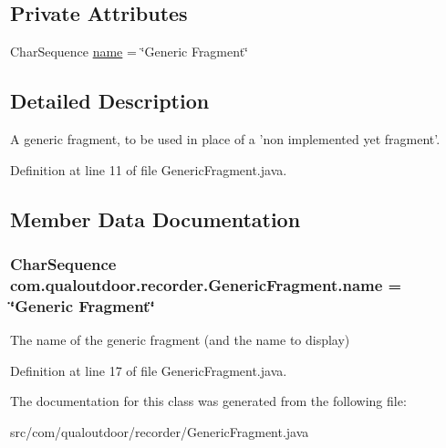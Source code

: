 \subsection*{Private Attributes}
\begin{DoxyCompactItemize}
\item 
Char\-Sequence \hyperlink{classcom_1_1qualoutdoor_1_1recorder_1_1GenericFragment_abd35750acf1a4b68e302201fc4cc3132}{name} = \char`\"{}Generic Fragment\char`\"{}
\end{DoxyCompactItemize}


\subsection{Detailed Description}
A generic fragment, to be used in place of a 'non implemented yet fragment'. 

Definition at line 11 of file Generic\-Fragment.\-java.



\subsection{Member Data Documentation}
\hypertarget{classcom_1_1qualoutdoor_1_1recorder_1_1GenericFragment_abd35750acf1a4b68e302201fc4cc3132}{
\subsubsection[{name}]{\setlength{\rightskip}{0pt plus 5cm}Char\-Sequence com.\-qualoutdoor.\-recorder.\-Generic\-Fragment.\-name = \char`\"{}Generic Fragment\char`\"{}\hspace{0.3cm}{\ttfamily [private]}}}\label{classcom_1_1qualoutdoor_1_1recorder_1_1GenericFragment_abd35750acf1a4b68e302201fc4cc3132}
The name of the generic fragment (and the name to display) 

Definition at line 17 of file Generic\-Fragment.\-java.



The documentation for this class was generated from the following file\-:\begin{DoxyCompactItemize}
\item 
src/com/qualoutdoor/recorder/Generic\-Fragment.\-java\end{DoxyCompactItemize}
